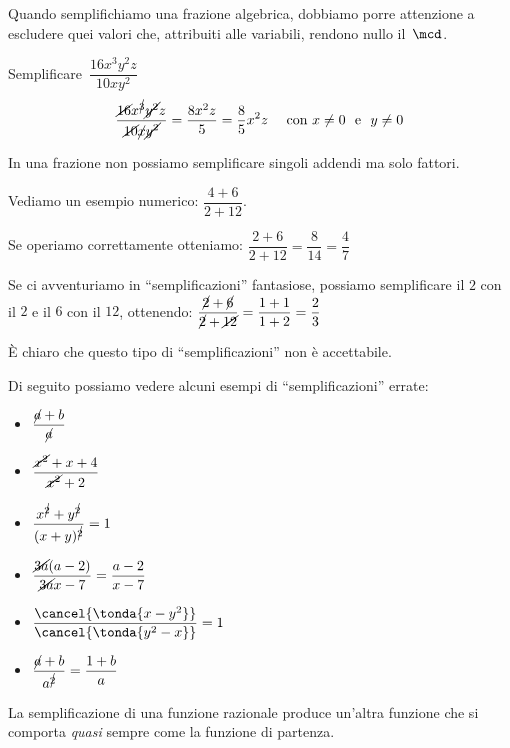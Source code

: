 Quando semplifichiamo una frazione algebrica, dobbiamo 
porre attenzione a escludere quei valori che, attribuiti alle variabili, 
rendono nullo il~\(\mcd\).

 \begin{esempio}
Semplificare~\(\dfrac{16x^{3}y^{2}z}{10xy^{2}}\)
\[\dfrac{\cancel{16}x^{\cancel{3}}\cancel{y^{2}}z}
        {\cancel{10}\cancel{x}\cancel{y^{2}}}=
\dfrac{8x^{2}z}{5}=\dfrac{8}{5}x^{2}z
\quad \text{ con } x \ne 0 \text{~~e~~} y \ne 0
\]
 \end{esempio}

 \osservazione In una frazione non possiamo semplificare singoli addendi 
 ma solo fattori. 
 
 Vediamo un esempio numerico: \quad \(\dfrac{4+6}{2+12}\). 
 
Se operiamo correttamente otteniamo: \quad
\(\dfrac{2+6}{2+12}=\dfrac{8}{14}=\dfrac{4}{7}\)

Se ci avventuriamo in ``semplificazioni'' fantasiose, possiamo 
semplificare il \(2\) con il \(2\) e il \(6\) con il 
\(12\), ottenendo: \quad
\(\dfrac{\cancel{2} +\cancel{6}}{\cancel{2} +\cancel{12}}=
\dfrac{1+1}{1+2}=\dfrac{2}{3}\)

È chiaro che questo tipo di ``semplificazioni'' non è accettabile.

\newpage %

Di seguito possiamo vedere alcuni esempi di ``semplificazioni'' errate:
\begin{multicols}{3}
\begin{itemize}
 \item \(\dfrac{\cancel{a}+b}{\cancel{a}}\)
 \item \(\dfrac{\cancel{x^2}+x+4}{\cancel{x^2}+2}\) 
 \item \(\dfrac{x^{\cancel{2}}+y^{\cancel{2}}}{(x+y)^{\cancel{2}}}=1\) 
 \item \(\dfrac{\cancel{3a}(a-2)}{\cancel{3a}x-7}=\dfrac{a-2}{x-7}\) 
 \item \(\dfrac{\cancel{ \tonda{x-y^2}}}
              {\cancel{ \tonda{y^2-x}}}=1\)
 \item \(\dfrac{\cancel{a}+b}{a^{\cancel{2}}}=\dfrac{1+b}{a}\)
\end{itemize}
\end{multicols}

La semplificazione di una funzione razionale produce un'altra funzione che si 
comporta \emph{quasi} sempre come la funzione di partenza.

